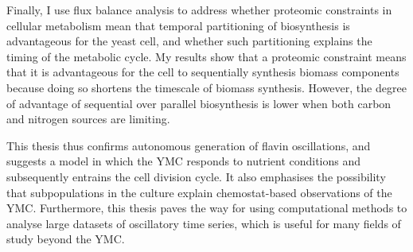 {  Finally, I use flux balance analysis to address whether proteomic constraints in cellular me\-tab\-o\-lism mean that temporal partitioning of biosynthesis is advantageous for the yeast cell, and whether such partitioning explains the timing of the metabolic cycle.
  My results show that a proteomic constraint means that it is advantageous for the cell to sequentially synthesis biomass components because doing so shortens the timescale of biomass synthesis.
  However, the degree of advantage of sequential over parallel biosynthesis is lower when both carbon and nitrogen sources are limiting.

  This thesis thus confirms autonomous generation of flavin oscillations, and suggests a model in which the YMC responds to nutrient conditions and subsequently entrains the cell division cycle.
  It also emphasises the possibility that subpopulations in the culture explain chemostat-based observations of the YMC.
  Furthermore, this thesis paves the way for using computational methods to analyse large datasets of oscillatory time series, which is useful for many fields of study beyond the YMC.
}




